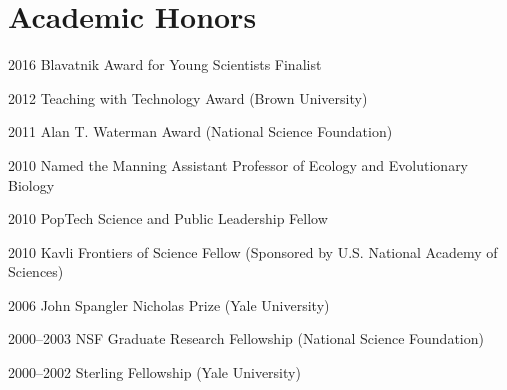 \section{Academic Honors}

\begin{entry}{60pt}

\item [\rm 2016] Blavatnik Award for Young Scientists Finalist
\item [\rm 2012] Teaching with Technology Award (Brown University)
\item [\rm 2011] Alan T. Waterman Award (National Science Foundation)
\item [\rm 2010] Named the Manning Assistant Professor of Ecology and Evolutionary Biology
\item [\rm 2010] PopTech Science and Public Leadership Fellow
\item [\rm 2010] Kavli Frontiers of Science Fellow (Sponsored by U.S. National Academy of Sciences)
\item [\rm 2006] John Spangler Nicholas Prize (Yale University)
\item [\rm 2000--2003] NSF Graduate Research Fellowship (National Science Foundation)
\item [\rm 2000--2002] Sterling Fellowship (Yale University)

\end{entry}
